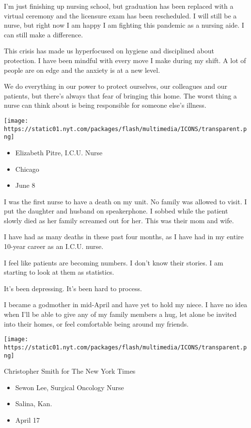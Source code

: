 I'm just finishing up nursing school, but graduation has been replaced
with a virtual ceremony and the licensure exam has been rescheduled. I
will still be a nurse, but right now I am happy I am fighting this
pandemic as a nursing aide. I can still make a difference.

This crisis has made us hyperfocused on hygiene and disciplined about
protection. I have been mindful with every move I make during my shift.
A lot of people are on edge and the anxiety is at a new level.

We do everything in our power to protect ourselves, our colleagues and
our patients, but there's always that fear of bringing this home. The
worst thing a nurse can think about is being responsible for someone
else's illness.

\texttt{[image: https://static01.nyt.com/packages/flash/multimedia/ICONS/transparent.png]}

\begin{itemize}
\tightlist
\item
  Elizabeth Pitre, I.C.U. Nurse
\item
  Chicago
\item
  June 8
\end{itemize}

I was the first nurse to have a death on my unit. No family was allowed
to visit. I put the daughter and husband on speakerphone. I sobbed while
the patient slowly died as her family screamed out for her. This was
their mom and wife.

I have had as many deaths in these past four months, as I have had in my
entire 10-year career as an I.C.U. nurse.

I feel like patients are becoming numbers. I don't know their stories. I
am starting to look at them as statistics.

It's been depressing. It's been hard to process.

I became a godmother in mid-April and have yet to hold my niece. I have
no idea when I'll be able to give any of my family members a hug, let
alone be invited into their homes, or feel comfortable being around my
friends.

\texttt{[image: https://static01.nyt.com/packages/flash/multimedia/ICONS/transparent.png]}

Christopher Smith for The New York Times

\begin{itemize}
\tightlist
\item
  Sewon Lee, Surgical Oncology Nurse
\item
  Salina, Kan.
\item
  April 17
\end{itemize}

